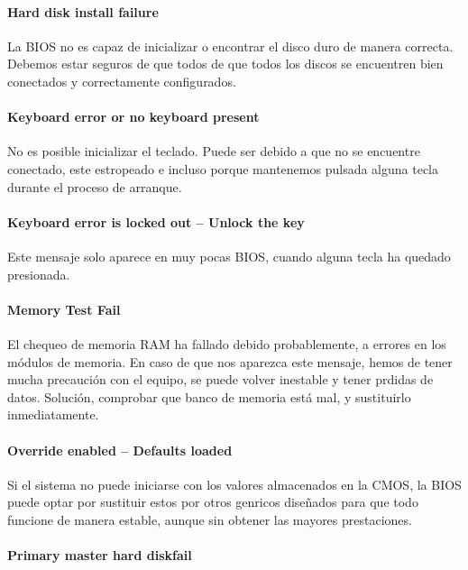 \documentclass[12pt,oneside,a4paper]{article}
\begin{document}
			\paragraph{Hard disk install failure}

			La BIOS no es capaz de inicializar o encontrar el disco duro de
			manera correcta. Debemos estar seguros de que todos de que todos
			los discos se encuentren bien conectados y correctamente
			configurados.

			\paragraph{Keyboard error or no keyboard present}

			No es posible inicializar el teclado. Puede ser debido a que no se
			encuentre conectado, este estropeado e incluso porque mantenemos
			pulsada alguna tecla durante el proceso de arranque.

			\paragraph{Keyboard error is locked out – Unlock the key}

			Este mensaje solo aparece en muy pocas BIOS, cuando alguna tecla ha
			quedado presionada. 

			\paragraph{Memory Test Fail}

			El chequeo de memoria RAM ha fallado debido probablemente, a
			errores en los módulos de memoria. En caso de que nos aparezca este
			mensaje, hemos de tener mucha precaución con el equipo, se puede
			volver inestable y tener prdidas de datos. Solución, comprobar que
			banco de memoria está mal, y sustituirlo inmediatamente. 

			\paragraph{Override enabled – Defaults loaded}

			Si el sistema no puede iniciarse con los valores almacenados en la
			CMOS, la BIOS puede optar por sustituir estos por otros genricos
			diseñados para que todo funcione de manera estable, aunque sin
			obtener las mayores prestaciones. 

			\paragraph{Primary master hard diskfail}
\end{document}
